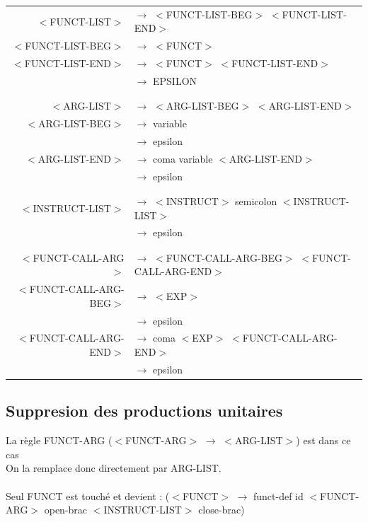 \documentclass[a4paper,10pt]{article}
\begin{document}
	\begin{center}\begin{tabular}{rl}				
					
		$<$FUNCT-LIST$>$		& $\rightarrow$ $<$FUNCT-LIST-BEG$>$ $<$FUNCT-LIST-END$>$\\
		$<$FUNCT-LIST-BEG$>$	& $\rightarrow$ $<$FUNCT$>$ \\
		$<$FUNCT-LIST-END$>$	& $\rightarrow$ $<$FUNCT$>$ $<$FUNCT-LIST-END$>$\\
								& $\rightarrow$ EPSILON \\
								&\\
								&\\

		$<$ARG-LIST$>$			& $\rightarrow$ $<$ARG-LIST-BEG$>$ $<$ARG-LIST-END$>$\\ 
		$<$ARG-LIST-BEG$>$		& $\rightarrow$ variable\\ 
								& $\rightarrow$ epsilon \\
		$<$ARG-LIST-END$>$		& $\rightarrow$ coma variable $<$ARG-LIST-END$>$\\ 
								& $\rightarrow$ epsilon \\
								&\\
								&\\
		$<$INSTRUCT-LIST$>$		& $\rightarrow$ $<$INSTRUCT$>$ semicolon $<$INSTRUCT-LIST$>$\\
								& $\rightarrow$ epsilon\\
								&\\
								&\\

		$<$FUNCT-CALL-ARG$>$	& $\rightarrow$ $<$FUNCT-CALL-ARG-BEG$>$ $<$FUNCT-CALL-ARG-END$>$\\ 
		$<$FUNCT-CALL-ARG-BEG$>$& $\rightarrow$ $<$EXP$>$\\ 
								& $\rightarrow$ epsilon \\
		$<$FUNCT-CALL-ARG-END$>$& $\rightarrow$ coma $<$EXP$>$ $<$FUNCT-CALL-ARG-END$>$\\ 
								& $\rightarrow$ epsilon \\
	\end{tabular}\end{center}




\subsection{Suppresion des productions unitaires}
	La règle FUNCT-ARG ($<$FUNCT-ARG$>$ $\rightarrow$ $<$ARG-LIST$>$) est dans ce cas\\
	On la remplace donc directement par ARG-LIST.\\
	~\\
	Seul FUNCT est touché et devient : ($<$FUNCT$>$	 $\rightarrow$ funct-def id $<$FUNCT-ARG$>$ open-brac $<$INSTRUCT-LIST$>$ close-brac) \\
\end{document}
